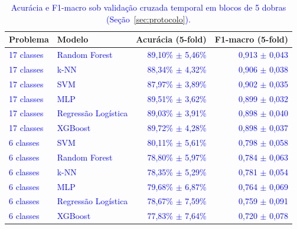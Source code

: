 \documentclass[times,final]{elsarticle}
\begin{document}
\begin{table}[H]
    \centering
    \caption{\textcolor{blue}{Acurácia e F1-macro sob validação cruzada temporal em blocos de 5 dobras (Seção~\ref{sec:protocolo}).}}
    \label{tab:res_cv}
    \begin{tabular}{@{}llrr@{}}
        \toprule
        \textbf{Problema} & \textbf{Modelo} & \textbf{Acurácia (5-fold)} & \textbf{F1-macro (5-fold)} \\
        \midrule
        \textcolor{blue}{17 classes} & \textcolor{blue}{Random Forest} & \textcolor{blue}{89,10\% $\pm$ 5,46\%} & \textcolor{blue}{0,913 $\pm$ 0,043}\\
        \textcolor{blue}{17 classes} & \textcolor{blue}{k-NN} & \textcolor{blue}{88,34\% $\pm$ 4,32\%} & \textcolor{blue}{0,906 $\pm$ 0,038}\\
        \textcolor{blue}{17 classes} & \textcolor{blue}{SVM} & \textcolor{blue}{87,97\% $\pm$ 3,89\%} & \textcolor{blue}{0,902 $\pm$ 0,035}\\
        \textcolor{blue}{17 classes} & \textcolor{blue}{MLP} & \textcolor{blue}{89,51\% $\pm$ 3,62\%} & \textcolor{blue}{0,899 $\pm$ 0,032}\\
        \textcolor{blue}{17 classes} & \textcolor{blue}{Regressão Logística} & \textcolor{blue}{89,03\% $\pm$ 3,91\%} & \textcolor{blue}{0,898 $\pm$ 0,040}\\
        \textcolor{blue}{17 classes} & \textcolor{blue}{XGBoost} & \textcolor{blue}{89,72\% $\pm$ 4,28\%} & \textcolor{blue}{0,898 $\pm$ 0,037}\\
        \textcolor{blue}{6 classes} & \textcolor{blue}{SVM} & \textcolor{blue}{80,11\% $\pm$ 5,61\%} & \textcolor{blue}{0,798 $\pm$ 0,058}\\
        \textcolor{blue}{6 classes} & \textcolor{blue}{Random Forest} & \textcolor{blue}{78,80\% $\pm$ 5,97\%} & \textcolor{blue}{0,784 $\pm$ 0,063}\\
        \textcolor{blue}{6 classes} & \textcolor{blue}{k-NN} & \textcolor{blue}{78,35\% $\pm$ 5,29\%} & \textcolor{blue}{0,781 $\pm$ 0,054}\\
        \textcolor{blue}{6 classes} & \textcolor{blue}{MLP} & \textcolor{blue}{79,68\% $\pm$ 6,87\%} & \textcolor{blue}{0,764 $\pm$ 0,069}\\
        \textcolor{blue}{6 classes} & \textcolor{blue}{Regressão Logística} & \textcolor{blue}{78,67\% $\pm$ 7,59\%} & \textcolor{blue}{0,759 $\pm$ 0,091}\\
        \textcolor{blue}{6 classes} & \textcolor{blue}{XGBoost} & \textcolor{blue}{77,83\% $\pm$ 7,64\%} & \textcolor{blue}{0,720 $\pm$ 0,078}\\
        \bottomrule
    \end{tabular}
\end{table}
\end{document}
